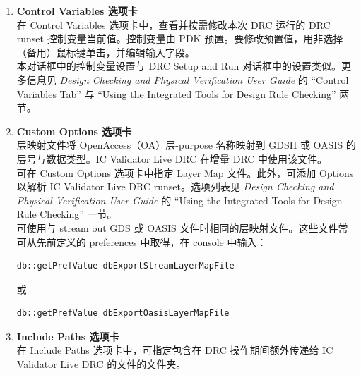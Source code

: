 \begin{enumerate}
\begin{enumerate}[label=\alph*.]
要选择 runset（规则）文件中的特定规则，单击相应按钮。在 Live DRC Rule Selection 对话框中选择要用于规则检查的规则，然后单击 \textbf{OK}。

在过滤框中，可输入要选择的项或规则的完整或部分名称，支持简单字符串匹配、glob 风格模式或正则表达式；由 General Options 对话框中的 Filters 选项控制。要清除过滤框，单击文本字段中所示的 \textbf{X}。（见 \textit{Custom Compiler Environment User Guide} 的 ``Entering General Option Settings'' 一节。）


    \item \textbf{Control Variables 选项卡}\\
    在 Control Variables 选项卡中，查看并按需修改本次 DRC 运行的 DRC runset 控制变量当前值。控制变量由 PDK 预置。要修改预置值，用非选择（备用）鼠标键单击，并编辑输入字段。\\
    本对话框中的控制变量设置与 DRC Setup and Run 对话框中的设置类似。更多信息见 \textit{Design Checking and Physical Verification User Guide} 的 ``Control Variables Tab'' 与 ``Using the Integrated Tools for Design Rule Checking'' 两节。


    \item \textbf{Custom Options 选项卡}\\
    层映射文件将 OpenAccess（OA）层-purpose 名称映射到 GDSII 或 OASIS 的层号与数据类型。IC Validator Live DRC 在增量 DRC 中使用该文件。\\
    可在 Custom Options 选项卡中指定 Layer Map 文件。此外，可添加 Options 以解析 IC Validator Live DRC runset。选项列表见 \textit{Design Checking and Physical Verification User Guide} 的 ``Using the Integrated Tools for Design Rule Checking'' 一节。\\
    可使用与 stream out GDS 或 OASIS 文件时相同的层映射文件。这些文件常可从先前定义的 preferences 中取得，在 console 中输入：
\begin{lstlisting}
db::getPrefValue dbExportStreamLayerMapFile
\end{lstlisting}
    或
\begin{lstlisting}
db::getPrefValue dbExportOasisLayerMapFile
\end{lstlisting}


    \item \textbf{Include Paths 选项卡}\\
    在 Include Paths 选项卡中，可指定包含在 DRC 操作期间额外传递给 IC Validator Live DRC 的文件的文件夹。

  \end{enumerate}
\end{enumerate}

